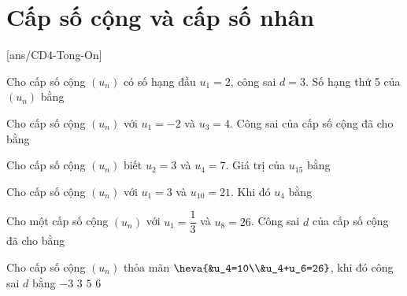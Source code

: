 \section{Cấp số cộng và cấp số nhân}
[ans/CD4-Tong-On]
\setcounter{ex}{0}%
\begin{ex}%
Cho cấp số cộng $(u_n)$ có số hạng đầu $u_1=2$, công sai $d=3$. Số hạng thứ 5 của $(u_n)$ bằng
\end{ex}
\begin{ex}%
    Cho cấp số cộng $(u_n)$ với $u_1=-2$ và $u_3=4$. Công sai của cấp số cộng đã cho bằng
\end{ex}
\begin{ex}%
Cho cấp số cộng $(u_n)$ biết $u_2=3$ và $u_4=7$. Giá trị của $u_{15}$ bằng
\end{ex}
\begin{ex}%
    Cho cấp số cộng $(u_n)$ với $u_1=3$ và $u_{10}=21$. Khi đó $u_4$ bằng
\end{ex}
\begin{ex}%
    Cho một cấp số cộng $(u_n)$ với $u_1=\dfrac{1}{3}$ và $u_8=26$. Công sai $d$ của cấp số cộng đã cho bằng
\end{ex}
\begin{ex}%
    Cho cấp số cộng $(u_n)$ thỏa mãn $\heva{&u_4=10\\&u_4+u_6=26}$, khi đó công sai $d$ bằng
    \choice
    {$-3$}
    {\True $3$}
    {$5$}
    {$6$}
\end{ex}
